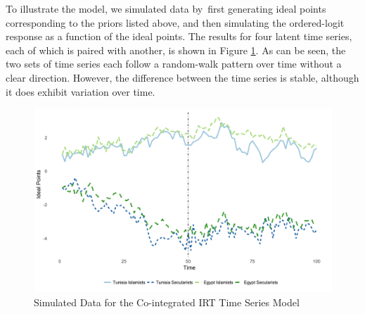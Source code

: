 \documentclass[12pt]{article}
\begin{document}
 To illustrate the model, we simulated data by first generating ideal points corresponding to the priors listed above, and then simulating the ordered-logit response as a function of the ideal points. The results for four latent time series, each of which is paired with another, is shown in Figure \ref{sim_data}. As can be seen, the two sets of time series each follow a random-walk pattern over time without a clear direction. However, the difference between the time series is stable, although it does exhibit variation over time. 
 \begin{figure}[!h]
 	\caption{Simulated Data for the Co-integrated IRT Time Series Model}\label{sim_data}
 	\centering
	\includegraphics[width=.9\linewidth]{ecm_example.png}
 \end{figure}
\end{document}
